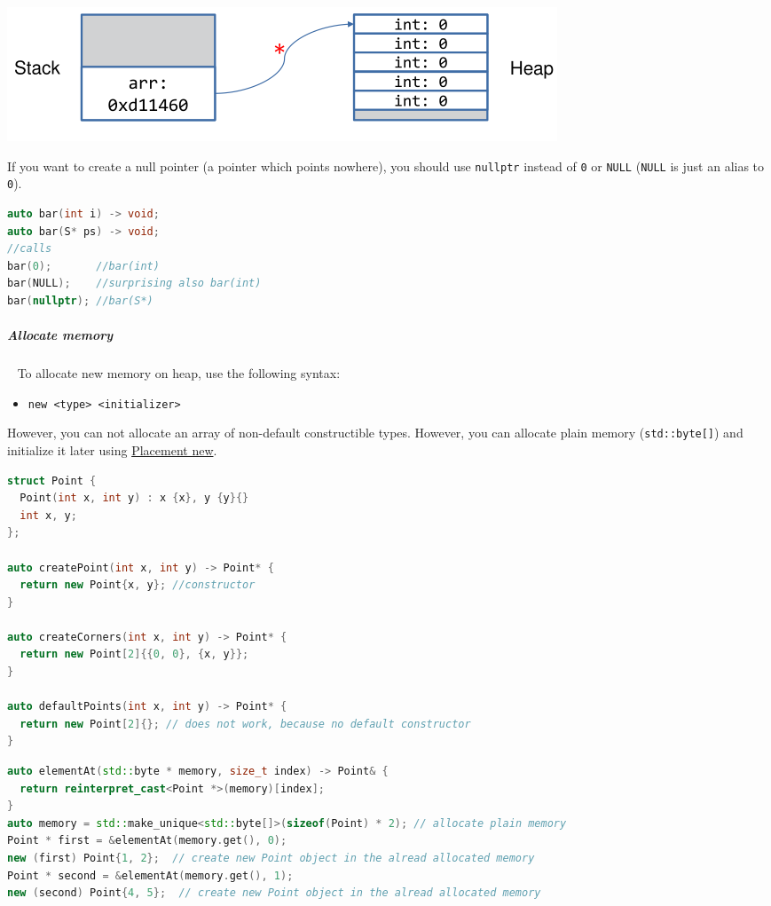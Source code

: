 \documentclass[11pt,twoside,landscape]{article}
\begin{document}
\begin{multicols}{2}
{
\begin{center}
\includegraphics[width=.9\linewidth]{img/pointer_to_array.png}
\end{center}
\label{fig:pointer-to-array}
}

If you want to create a null pointer (a pointer which points nowhere), you should use \texttt{nullptr} instead of \texttt{0} or \texttt{NULL} (\texttt{NULL} is just an alias to \texttt{0}).

\begin{lstlisting}[language=c++,numbers=none]
auto bar(int i) -> void;
auto bar(S* ps) -> void;
//calls
bar(0);       //bar(int)
bar(NULL);    //surprising also bar(int)
bar(nullptr); //bar(S*)
\end{lstlisting}

\subparagraph{Allocate memory} \
\label{sec:org5acad63}
To allocate new memory on heap, use the following syntax:
\begin{itemize}
\item \texttt{new <type> <initializer>}
\end{itemize}


However, you can not allocate an array of non-default constructible types.
However, you can allocate plain memory (\texttt{std::byte[]}) and initialize it later using \href{../../../roam/20230622180239-what_is_placement_new_in_cpp.org}{Placement new}.

\begin{lstlisting}[language=c++,label=lst:orga060ac0,caption={Allocate new memory on heap},captionpos=b,numbers=none]
struct Point {
  Point(int x, int y) : x {x}, y {y}{}
  int x, y;
};

auto createPoint(int x, int y) -> Point* {
  return new Point{x, y}; //constructor
}

auto createCorners(int x, int y) -> Point* {
  return new Point[2]{{0, 0}, {x, y}};
}

auto defaultPoints(int x, int y) -> Point* {
  return new Point[2]{}; // does not work, because no default constructor
}
\end{lstlisting}

\begin{lstlisting}[language=c++,label=lst:org38096ef,caption={Example for a non default constructible type on the heap},captionpos=b,numbers=none]
auto elementAt(std::byte * memory, size_t index) -> Point& {
  return reinterpret_cast<Point *>(memory)[index];
}
auto memory = std::make_unique<std::byte[]>(sizeof(Point) * 2); // allocate plain memory
Point * first = &elementAt(memory.get(), 0);
new (first) Point{1, 2};  // create new Point object in the alread allocated memory
Point * second = &elementAt(memory.get(), 1);
new (second) Point{4, 5};  // create new Point object in the alread allocated memory


\end{lstlisting}
\end{multicols}
\end{document}
